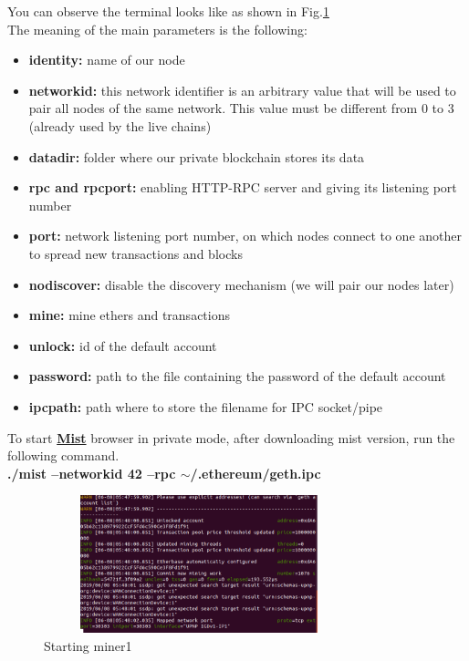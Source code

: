 \documentclass[journal,12pt,twocolumn]{IEEEtran}
\begin{document}
\begin{enumerate}
You can observe the terminal looks like as shown in   
Fig.\ref{fig:2} \\
  
The meaning of the main parameters is the following:

\begin{itemize}
\item \textbf{identity:} name of our node
\item  \textbf{networkid:} this network identifier is an arbitrary value that will be used to pair all nodes of the same network. This value must be different from 0 to 3 (already used by the live chains)
\item \textbf{datadir:} folder where our private blockchain stores its data
\item \textbf{rpc and rpcport:} enabling HTTP-RPC server and giving its listening port number
\item \textbf{port:} network listening port number, on which nodes connect to one another to spread new transactions and blocks
\item \textbf{nodiscover:} disable the discovery mechanism (we will pair our nodes later)
\item \textbf{mine:} mine ethers and transactions
\item \textbf{unlock:} id of the default account
\item \textbf{password:} path to the file containing the password of the default account
\item \textbf{ipcpath:} path where to store the filename for IPC socket/pipe
\end{itemize}
\hspace*{1cm}To start \href{https://github.com/ethereum/mist/releases}{\textbf{Mist}} browser in private mode, after downloading mist version, run the following command.\\
     \textbf{ ./mist --networkid 42 --rpc $\sim$/.ethereum/geth.ipc}\\
    
    
\begin{figure}
  \includegraphics[width=9cm, height=4cm]{run.png}
  \caption{Starting miner1}
  \label{fig:2}
\end{figure}       
  

\end{enumerate}
\end{document}
